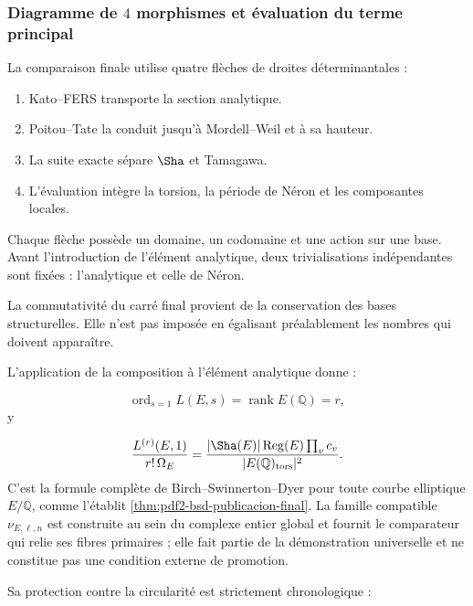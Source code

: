 \subsubsection{Diagramme de \(4\) morphismes et évaluation du terme principal}
La comparaison finale utilise quatre flèches de droites déterminantales :\par
\begin{enumerate}
\item Kato–FERS transporte la section analytique.
\item Poitou–Tate la conduit jusqu’à Mordell–Weil et à sa hauteur.
\item La suite exacte sépare \(\Sha\) et Tamagawa.
\item L’évaluation intègre la torsion, la période de Néron et les composantes locales.
\end{enumerate}
Chaque flèche possède un domaine, un codomaine et une action sur une base. Avant l’introduction de l’élément analytique, deux trivialisations indépendantes sont fixées : l’analytique et celle de Néron.\par
La commutativité du carré final provient de la conservation des bases structurelles. Elle n’est pas imposée en égalisant préalablement les nombres qui doivent apparaître.\par
L’application de la composition à l’élément analytique donne :\par
\[
\operatorname{ord}_{s=1}L(E,s)
=
\operatorname{rank}E(\mathbb Q)
=
r,
\]
y\par
\[
\frac{L^{(r)}(E,1)}
{r!\,\Omega_E}
=
\frac{
|\Sha(E)|
\operatorname{Reg}(E)
\prod_v c_v
}{
|E(\mathbb Q)_{\mathrm{tors}}|^2
}.
\]
C’est la formule complète de Birch--Swinnerton--Dyer pour toute courbe elliptique \(E/\mathbb Q\), comme l’établit \cref{thm:pdf2-bsd-publicacion-final}. La famille compatible \(\nu_{E,\ell,n}\) est construite au sein du complexe entier global et fournit le comparateur qui relie ses fibres primaires ; elle fait partie de la démonstration universelle et ne constitue pas une condition externe de promotion.\par
Sa protection contre la circularité est strictement chronologique :\par
